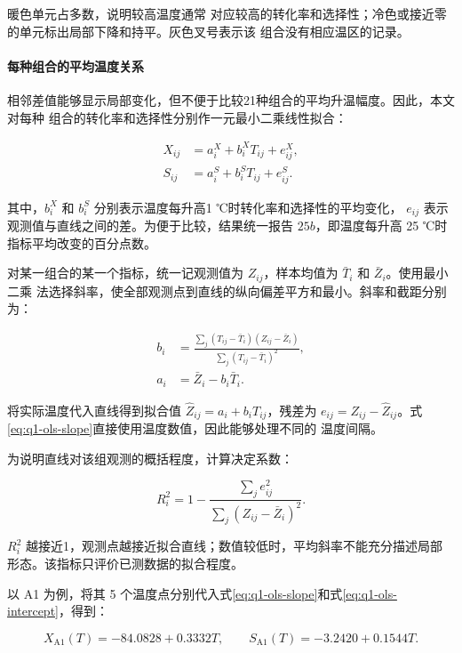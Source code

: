 暖色单元占多数，说明较高温度通常
对应较高的转化率和选择性；冷色或接近零的单元标出局部下降和持平。灰色叉号表示该
组合没有相应温区的记录。

\paragraph{每种组合的平均温度关系}

相邻差值能够显示局部变化，但不便于比较21种组合的平均升温幅度。因此，本文对每种
组合的转化率和选择性分别作一元最小二乘线性拟合：

\begin{align}
X_{ij}&=a_i^X+b_i^XT_{ij}+e_{ij}^X, \tag{4}\\
S_{ij}&=a_i^S+b_i^ST_{ij}+e_{ij}^S. \tag{5}
\end{align}

其中，$b_i^X$ 和 $b_i^S$ 分别表示温度每升高1 ℃时转化率和选择性的平均变化，
$e_{ij}$ 表示观测值与直线之间的差。为便于比较，结果统一报告 \(25b\)，即温度每升高
25 ℃时指标平均改变的百分点数。

对某一组合的某一个指标，统一记观测值为 $Z_{ij}$，样本均值为 $\bar T_i$ 和 $\bar Z_i$。使用最小二乘
法选择斜率，使全部观测点到直线的纵向偏差平方和最小。斜率和截距分别为：

\begin{align}
b_i&=\frac{\sum_j(T_{ij}-\bar T_i)(Z_{ij}-\bar Z_i)}
{\sum_j(T_{ij}-\bar T_i)^2}, \tag{6}\label{eq:q1-ols-slope}\\
a_i&=\bar Z_i-b_i\bar T_i. \tag{7}\label{eq:q1-ols-intercept}
\end{align}

将实际温度代入直线得到拟合值 \(\widehat Z_{ij}=a_i+b_iT_{ij}\)，残差为
\(e_{ij}=Z_{ij}-\widehat Z_{ij}\)。式\eqref{eq:q1-ols-slope}直接使用温度数值，因此能够处理不同的
温度间隔。

为说明直线对该组观测的概括程度，计算决定系数：

\begin{equation}
R_i^2=1-\frac{\sum_j e_{ij}^2}{\sum_j(Z_{ij}-\bar Z_i)^2}.
\tag{8}
\end{equation}

\(R_i^2\) 越接近1，观测点越接近拟合直线；数值较低时，平均斜率不能充分描述局部
形态。该指标只评价已测数据的拟合程度。

以 A1 为例，将其 5 个温度点分别代入式\eqref{eq:q1-ols-slope}和式\eqref{eq:q1-ols-intercept}，得到：

\[
X_{\mathrm{A1}}(T)=-84.0828+0.3332T,\qquad
S_{\mathrm{A1}}(T)=-3.2420+0.1544T.
\]

